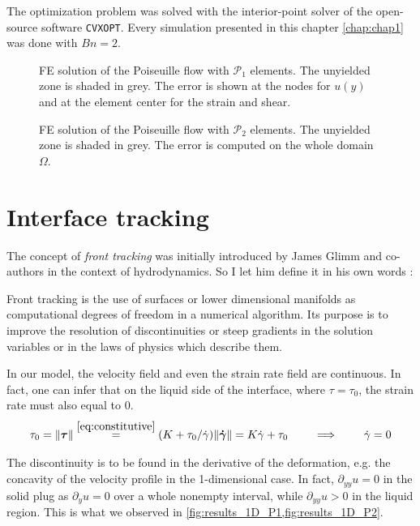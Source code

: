 \documentclass[11 pt]{report}
\begin{document}
The optimization problem was solved with the interior-point solver of the open-source software \texttt{CVXOPT}. Every simulation presented in this chapter \cref{chap:chap1} was done with $Bn=2$.

\begin{figure}
    \centering
    
    \caption{FE solution of the Poiseuille flow with $\mathcal{P}_1$ elements. The unyielded zone is shaded in grey. The error is shown at the nodes for $u(y)$ and at the element center for the strain and shear.}
    \label{fig:results_1D_P1}
\end{figure}

\begin{figure}
    \centering
    
    \caption{FE solution of the Poiseuille flow with $\mathcal{P}_2$ elements. The unyielded zone is shaded in grey. The error is computed on the whole domain $\Omega$.}
    \label{fig:results_1D_P2}
\end{figure}


\section{Interface tracking}

The concept of \textit{front tracking} was initially introduced by James Glimm and co-authors \cite{chern1986front} in the context of hydrodynamics. So I let him define it in his own words \cite{SHE2016383}:
\begin{displayquote}
    Front tracking is the use of surfaces or lower dimensional manifolds as computational degrees of freedom in a numerical algorithm. Its purpose is to improve the resolution of discontinuities or steep gradients in the solution variables or in the laws of physics which describe them.
\end{displayquote}

In our model, the velocity field and even the strain rate field are continuous. In fact, one can infer that on the liquid side of the interface, where $\tau=\tau_0$, the strain rate must also equal to $0$.
\begin{equation}
    \tau_0 = \|\boldsymbol \tau\| \stackrel{\eqref{eq:constitutive}}{=} (K + \tau_0 / \dot \gamma) \|\boldsymbol{\dot \gamma}\| = K \dot \gamma + \tau_0 \qquad \implies \qquad \dot \gamma = 0
\end{equation}

The discontinuity is to be found in the derivative of the deformation, e.g. the concavity of the velocity profile in the 1-dimensional case. In fact, $\partial_{yy} u = 0$ in the solid plug as $\partial_y u = 0$ over a whole nonempty interval, while $\partial_{yy} u > 0$ in the liquid region. This is what we observed in \cref{fig:results_1D_P1,fig:results_1D_P2}.
\end{document}
